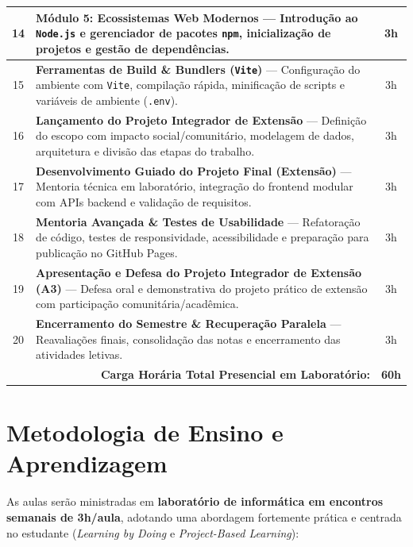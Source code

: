 \documentclass[12pt,a4paper]{article}
\begin{document}
\begin{table}[H]
\begin{tabularx}{\textwidth}{|c|X|c|}
14 & \textbf{Módulo 5: Ecossistemas Web Modernos} — Introdução ao \texttt{Node.js} e gerenciador de pacotes \texttt{npm}, inicialização de projetos e gestão de dependências. & 3h \\ \hline
\rowcolor{cinzaLinha}
15 & \textbf{Ferramentas de Build \& Bundlers (\texttt{Vite})} — Configuração do ambiente com \texttt{Vite}, compilação rápida, minificação de scripts e variáveis de ambiente (\texttt{.env}). & 3h \\ \hline
16 & \textbf{Lançamento do Projeto Integrador de Extensão} — Definição do escopo com impacto social/comunitário, modelagem de dados, arquitetura e divisão das etapas do trabalho. & 3h \\ \hline
\rowcolor{cinzaLinha}
17 & \textbf{Desenvolvimento Guiado do Projeto Final (Extensão)} — Mentoria técnica em laboratório, integração do frontend modular com APIs backend e validação de requisitos. & 3h \\ \hline
18 & \textbf{Mentoria Avançada \& Testes de Usabilidade} — Refatoração de código, testes de responsividade, acessibilidade e preparação para publicação no GitHub Pages. & 3h \\ \hline
\rowcolor{cinzaLinha}
19 & \textbf{Apresentação e Defesa do Projeto Integrador de Extensão (A3)} — Defesa oral e demonstrativa do projeto prático de extensão com participação comunitária/acadêmica. & 3h \\ \hline
20 & \textbf{Encerramento do Semestre \& Recuperação Paralela} — Reavaliações finais, consolidação das notas e encerramento das atividades letivas. & 3h \\ \hline
\multicolumn{2}{|r|}{\textbf{Carga Horária Total Presencial em Laboratório:}} & \textbf{60h} \\ \hline
\end{tabularx}
\end{table}

\section{Metodologia de Ensino e Aprendizagem}

As aulas serão ministradas em \textbf{laboratório de informática em encontros semanais de 3h/aula}, adotando uma abordagem fortemente prática e centrada no estudante (\textit{Learning by Doing} e \textit{Project-Based Learning}):
\end{document}
